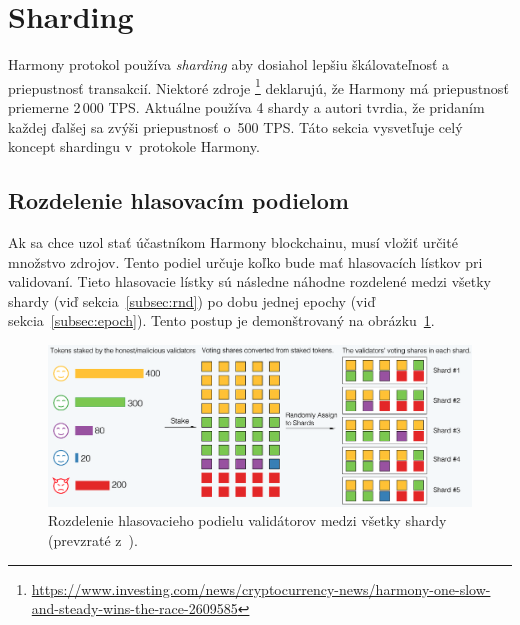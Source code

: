


\section{Sharding}\label{sec:harmony-shards}

Harmony protokol používa \textit{sharding} aby dosiahol lepšiu škálovateľnosť a priepustnosť transakcií. Niektoré zdroje%
\footnote{\url{https://www.investing.com/news/cryptocurrency-news/harmony-one-slow-and-steady-wins-the-race-2609585}} deklarujú, že Harmony má priepustnosť priemerne 2\,000 TPS. Aktuálne používa 4 shardy a autori tvrdia, že pridaním každej ďalšej sa zvýši priepustnosť o~500 TPS. Táto sekcia vysvetľuje celý koncept shardingu v~protokole Harmony.

\subsection{Rozdelenie hlasovacím podielom}\label{subsec:rand-dist}
Ak sa chce uzol stať účastníkom Harmony blockchainu, musí vložiť určité množstvo zdrojov. Tento podiel určuje koľko bude mať hlasovacích lístkov pri validovaní. Tieto hlasovacie lístky sú následne náhodne rozdelené medzi všetky shardy (viď sekcia~\ref{subsec:rnd}) po dobu jednej epochy (viď sekcia~\ref{subsec:epoch}). Tento postup je demonštrovaný na obrázku~\ref{img:harmony-sharding}.

\begin{figure}[bt]
	\centering
	\includegraphics[width=\textwidth]{obrazky-figures/harmony-sharding}
	\caption{Rozdelenie hlasovacieho podielu validátorov medzi všetky shardy (prevzraté z~\cite{harmonyDoc}).}
	\label{img:harmony-sharding}
\end{figure}

